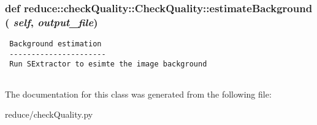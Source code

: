 \subsubsection{\setlength{\rightskip}{0pt plus 5cm}def reduce::check\-Quality::Check\-Quality::estimate\-Background ( {\em self},  {\em output\_\-file})}\label{classreduce_1_1checkQuality_1_1CheckQuality_bd560e96e77abc3799b5e86b8f63a9ae}




\footnotesize\begin{verbatim}
 Background estimation
 ---------------------- 
 Run SExtractor to esimte the image background
 
\end{verbatim}
\normalsize
 

The documentation for this class was generated from the following file:\begin{CompactItemize}
\item 
reduce/check\-Quality.py\end{CompactItemize}
